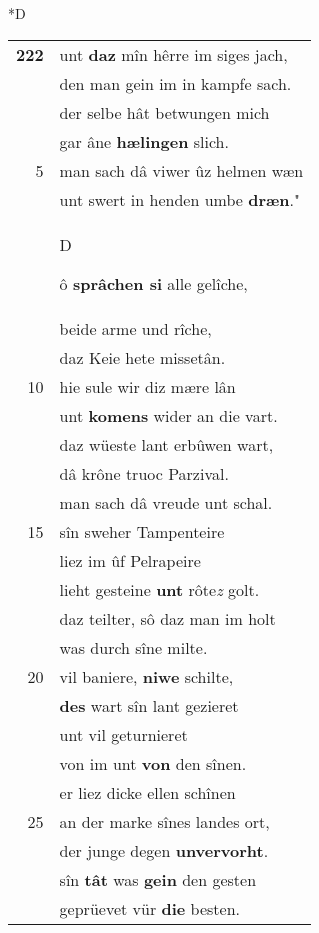 \documentclass[8pt,a4paper,notitlepage]{article}
\begin{document}
\begin{table}[ht]
\begin{minipage}[t]{0.5\linewidth}
\small
\begin{center}*D
\end{center}
\begin{tabular}{rl}
\textbf{222} & unt \textbf{daz} mîn hêrre im siges jach,\\ 
 & den man gein im in kampfe sach.\\ 
 & der selbe hât betwungen mich\\ 
 & gar âne \textbf{hælingen} slich.\\ 
5 & man sach dâ viwer ûz helmen wæn\\ 
 & unt swert in henden umbe \textbf{dræn}."\\ 
 & \begin{large}D\end{large}ô \textbf{sprâchen si} alle gelîche,\\ 
 & beide arme und rîche,\\ 
 & daz Keie hete missetân.\\ 
10 & hie sule wir diz mære lân\\ 
 & unt \textbf{komens} wider an die vart.\\ 
 & daz wüeste lant erbûwen wart,\\ 
 & dâ krône truoc Parzival.\\ 
 & man sach dâ vreude unt schal.\\ 
15 & sîn sweher Tampenteire\\ 
 & liez im ûf Pelrapeire\\ 
 & lieht gesteine \textbf{unt} rôte\textit{z} golt.\\ 
 & daz teilter, sô daz man im holt\\ 
 & was durch sîne milte.\\ 
20 & vil baniere, \textbf{niwe} schilte,\\ 
 & \textbf{des} wart sîn lant gezieret\\ 
 & unt vil geturnieret\\ 
 & von im unt \textbf{von} den sînen.\\ 
 & er liez dicke ellen schînen\\ 
25 & an der marke sînes landes ort,\\ 
 & der junge degen \textbf{unvervorht}.\\ 
 & sîn \textbf{tât} was \textbf{gein} den gesten\\ 
 & geprüevet vür \textbf{die} besten.\\ 

\end{tabular}
\end{minipage}
\end{table}
\end{document}
